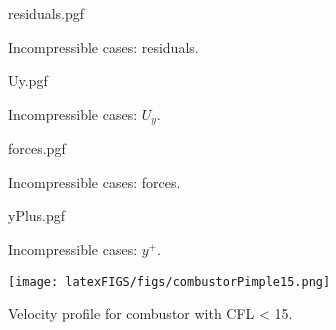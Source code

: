\newpage

\setcounter{lastPage}{\thepage}
\setcounter{page}{1}
\renewcommand{\thepage}{INC-\roman{page}}

\begin{figure}[!h]
    \centering
    {residuals.pgf}
    \caption{Incompressible cases: residuals.}
    \label{fig:Res}
\end{figure}

\begin{figure}[!h]
    \centering
    {Uy.pgf}
    \caption{Incompressible cases: $U_y$.}
    \label{fig:Uy}
\end{figure}

\begin{figure}[!h]
    \centering
    {forces.pgf}
    \caption{Incompressible cases: forces.}
    \label{fig:forces}
\end{figure}

\begin{figure}[!h]
    \centering
    {yPlus.pgf}
    \caption{Incompressible cases: $y^+$.}
    \label{fig:yPlus}
\end{figure}

\begin{figure}[!h]
    \texttt{[image: latexFIGS/figs/combustorPimple15.png]}
    \caption{Velocity profile for combustor with CFL < 15.}
\end{figure}

\clearpage
